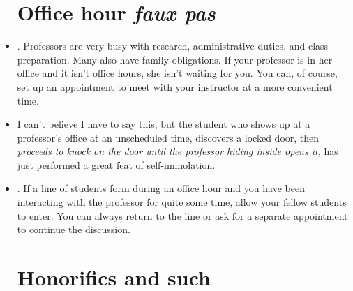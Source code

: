 \begin{itemize}

\section{Office hour \emph{faux pas}}

\item {}. Professors are very busy with research, administrative duties, and class preparation. Many also have family obligations. If your professor is in her office and it isn't office hours, she isn't waiting for you. You can, of course, set up an appointment to meet with your instructor at a more convenient time. 

\item {} I can't believe I have to say this, but the student who shows up at a professor's office at an unscheduled time, discovers a locked door, then \emph{proceeds to knock on the door until the professor hiding inside opens it,} has just performed a great feat of self-immolation.

\item {}. If a line of students form during an office hour and you have been interacting with the professor for quite some time, allow your fellow students to enter. You can always return to the line or ask for a separate appointment to continue the discussion. 

\section{Honorifics and such}


\end{itemize}
